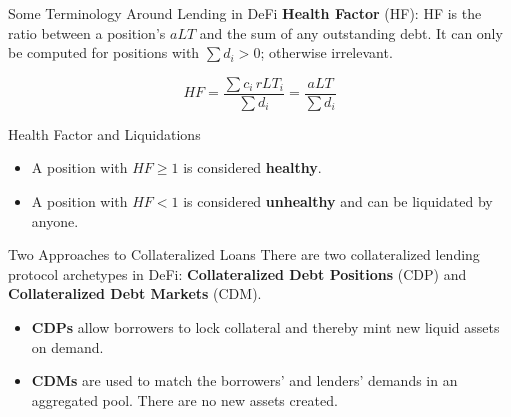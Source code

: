 \documentclass[handout]{beamer}
\begin{document}
\begin{frame}{Some Terminology Around Lending in DeFi}
\textbf{Health Factor} (HF): HF is the ratio between a position's $aLT$ and the sum of any outstanding debt. It can only be computed for positions with $\sum d_i > 0$; otherwise irrelevant.

\begin{equation*}
	  HF = \frac{\sum c_i \, rLT_i}{\sum d_i} =  \frac{aLT}{\sum d_i} 
	  \label{eq:HF} 
\end{equation*}

\vspace{1.0em}
\begin{keytakeaway}{Health Factor and Liquidations}
\begin{itemize}
	\item A position with $HF \geq 1$ is considered \textbf{healthy}.
	\item A position with $HF < 1$ is considered \textbf{unhealthy} and can be liquidated by anyone.
\end{itemize}
\end{keytakeaway}



\end{frame}

\begin{frame}{Two Approaches to Collateralized Loans}
	\vspace{1em}
	There are two collateralized lending protocol archetypes in DeFi: \textbf{Collateralized Debt Positions} (CDP) and \textbf{Collateralized Debt Markets} (CDM).\\ \vspace{1em}

	\begin{itemize}
		\item \textbf{CDPs} allow borrowers to lock collateral and thereby mint new liquid assets on demand.
		\item \textbf{CDMs} are used to match the borrowers' and lenders' demands in an aggregated pool. There are no new assets created.
	\end{itemize}
	
\end{frame}
\end{document}
